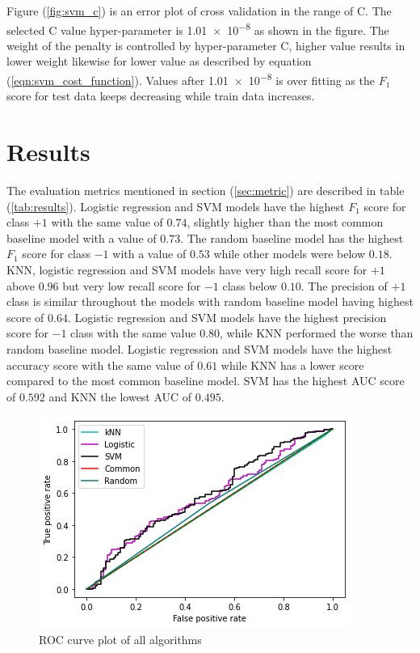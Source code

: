 \documentclass[transmag]{IEEEtran}
\begin{document}
\noindent Figure (\ref{fig:svm_c}) is an error plot of cross validation in the range of C. The selected C value hyper-parameter is \num{1.01e-8} as shown in the figure. The weight of the penalty is controlled by hyper-parameter C, higher value results in lower weight likewise for lower value as described by equation (\ref{eqn:svm_cost_function}). Values after \num{1.01e-8} is over fitting as the $F_1$ score for test data keeps decreasing while train data increases.

\section{Results}

\noindent The evaluation metrics mentioned in section (\ref{sec:metric}) are described in table (\ref{tab:results}). Logistic regression and SVM models have the highest $F_1$ score for class $+1$ with the same value of $0.74$, slightly higher than the most common baseline model with a value of $0.73$. The random baseline model has the highest $F_1$ score for class $-1$ with a value of $0.53$ while other models were below $0.18$. KNN, logistic regression and SVM models have very high recall score for $+1$ above $0.96$ but very low recall score for $-1$ class below $0.10$. The precision of $+1$ class is similar throughout the models with random baseline model having highest score of $0.64$. Logistic regression and SVM models have the highest precision score for $-1$ class with the same value $0.80$, while KNN performed the worse than random baseline model. Logistic regression and SVM models have the highest accuracy score with the same value of $0.61$ while KNN has a lower score compared to the most common baseline model. SVM has the highest AUC score of $0.592$ and KNN the lowest AUC of $0.495$.

\begin{figure}[h]
	\includegraphics[width=\columnwidth]{roc_curve.png} 
    \caption{ROC curve plot of all algorithms}%
    \label{fig:results_roc}%
\end{figure}
\end{document}
